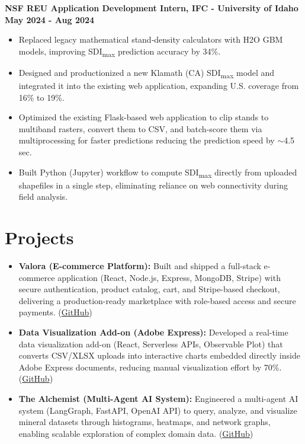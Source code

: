 \documentclass[10pt]{article}
\begin{document}
\textbf{NSF REU Application Development Intern, IFC - University of Idaho} \hfill \textbf{May 2024 - Aug 2024}
\begin{itemize}[leftmargin=*, itemsep=1pt]
\item Replaced legacy mathematical stand‑density calculators with H2O GBM models, improving SDI\textsubscript{max} prediction accuracy by 34\%.
\item Designed and productionized a new Klamath (CA) SDI\textsubscript{max} model and integrated it into the existing web application, expanding U.S. coverage from 16\% to 19\%.
\item Optimized the existing Flask-based web application to clip stands to multiband rasters, convert them to CSV, and batch-score them via multiprocessing for faster predictions reducing the prediction speed by \(\sim\)4.5 sec.
\item Built Python (Jupyter) workflow to compute SDI\textsubscript{max} directly from uploaded shapefiles in a single step, eliminating reliance on web connectivity during field analysis.

\end{itemize}

\vspace{-10pt}

\section*{Projects}
\begin{itemize}[leftmargin=*, itemsep=1pt]

\item \textbf{Valora (E-commerce Platform):}
Built and shipped a full-stack e-commerce application (React, Node.js, Express, MongoDB, Stripe) with secure authentication, product catalog, cart, and Stripe-based checkout, delivering a production-ready marketplace with role-based access and secure payments.
(\href{https://github.com/prateekrauniyar345/Valora}{GitHub})


\item \textbf{Data Visualization Add-on (Adobe Express):}
Developed a real-time data visualization add-on (React, Serverless APIs, Observable Plot) that converts CSV/XLSX uploads into interactive charts embedded directly inside Adobe Express documents, reducing manual visualization effort by 70\%.
(\href{https://github.com/prateekrauniyar345/adobe-first-add-on}{GitHub})

\item \textbf{The Alchemist (Multi-Agent AI System):}
Engineered a multi-agent AI system (LangGraph, FastAPI, OpenAI API) to query, analyze, and visualize mineral datasets through histograms, heatmaps, and network graphs, enabling scalable exploration of complex domain data.
(\href{https://github.com/prateekrauniyar345/Senior-Design-The-Alchemist}{GitHub})

\end{itemize}
\end{document}
